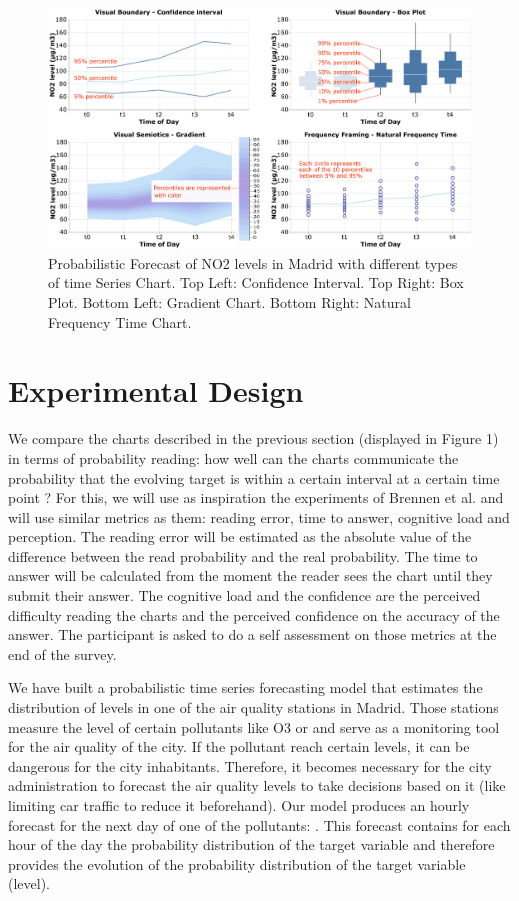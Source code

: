 \documentclass[a4paper,3p,sort&compress]{elsarticle}
\begin{document}
\begin{figure}
  \centering
  \includegraphics[width=.9\textwidth]{charts_vector} 
  \caption{\label{figure:charts} Probabilistic Forecast of NO2 levels in Madrid with different types of time Series Chart. 
  Top Left: Confidence Interval. Top Right: Box Plot. 
  Bottom Left: Gradient Chart. Bottom Right: Natural Frequency Time Chart. }
\end{figure} 

\section{Experimental Design}
\label{sec:exp_design}

We compare the charts described in the previous section (displayed in Figure 1) 
in terms of probability 
reading: how well 
can the charts communicate the probability that the evolving target is within a certain interval 
at a certain time point ?
 For this, we will use as inspiration the experiments of Brennen et al. \cite{brennen_instrument_2018}
and will use similar metrics 
as them: reading error, time to answer, cognitive load and perception. The reading error will be estimated as the 
absolute value of the difference between the read probability and the real probability. The time to answer 
will be calculated from the moment the reader sees the chart until they submit their answer. The cognitive 
load and the confidence are the perceived difficulty reading the charts and the perceived confidence on 
the accuracy of 
the answer. The participant is asked to do a self assessment on those metrics at the end of the survey.

We have built a probabilistic time series forecasting model that estimates the distribution of \no 
levels in one of the air quality stations in Madrid. Those stations measure the level of certain 
pollutants like O3 or \no and serve as a monitoring tool for the air quality of the city. If the pollutant 
reach certain levels, it can be dangerous for the city inhabitants. Therefore, it becomes necessary 
for the city administration to 
forecast the air quality levels to take decisions based on it (like limiting car traffic to reduce it beforehand).
Our model produces an hourly forecast for the next day of one of the pollutants: \no. This forecast contains
for each hour of the day the probability distribution of the target variable and therefore provides the evolution 
of the probability distribution of the target variable (\no level).
\end{document}
